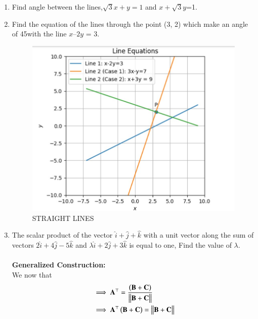 \begin{enumerate}[label=\thesection.\arabic*,ref=\thesection.\theenumi]
\label{chapters/11/10/1/11}

\item    Find angle between the lines,$\sqrt{3}x+y=1$ and $x+\sqrt{3}y$=1.
\label{chapters/11/10/3/9}

\item Find the equation of the lines through the point (3, 2) which make an angle of 45\degree  with the line $x – 2y$ = 3.
\label{chapters/11/10/4/11}\\
\solution

\begin{figure}[H]
\centering
\includegraphics[width=\columnwidth]{chapters/11/10/4/11/figs/strline.jpg}
\caption{STRAIGHT LINES}
\label{fig:chapters/11/10/4/11/figs/strline.jpg}
\end{figure}
\item\textbf{}The scalar product of the vector $\hat{i}+\hat{j}+\hat{k}$ with a unit vector along the sum of vectors $2\hat{i}+4\hat{j}-5\hat{k}$ and $\lambda\hat{i}+2\hat{j}+3\hat{k}$ is equal to one, Find the value of $\lambda$.
\\\\
\textbf{Generalized Construction:}\\
We now that \\
\begin{align}
   &\implies \vec{A}^\top = \frac{\brak{\vec{B}+\vec{C}}}{\norm{\vec{B}+\vec{C}}}\\
       &\implies \vec{A}^\top \brak{\vec{B}+\vec{C}}=\norm{\vec{B}+\vec{C}} \label{eq:Eqat2}\\

\end{align}
\end{enumerate}
